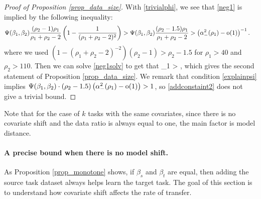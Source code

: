 \begin{proof}[Proof of Proposition \ref{prop_data_size}]
With \eqref{trivialphi}, we see that \eqref{neg1} is implied by the following inequality:
\begin{align}\label{neg1solv}
 & \Psi(\beta_1,\beta_2)  \frac{(\rho_2-1) \rho_1 }{\rho_1+\rho_2-2}\left( 1-\frac{1}{(\rho_1+\rho_2-2)^2}\right) >  \Psi(\beta_1,\beta_2) \frac{(\rho_2-1.5) \rho_1 }{\rho_1+\rho_2-2}> \left( \alpha_-^2(\rho_1) -  \operatorname{o}(1) \right)^{-1} .
 \end{align}
 where we used $(1-(\rho_1+\rho_2-2)^{-2})(\rho_2 - 1) > \rho_2-1.5$ for $\rho_1>40$ and $\rho_2>110$. Then we can solve \eqref{neg1solv} to get that
 \be\label{addconstaint2}
 \rho_1 >   ,
 \ee
which gives the second statement of Proposition \ref{prop_data_size}.
We remark that condition \eqref{explainpsi} implies $\Psi(\beta_1, \beta_2) \cdot  (\rho_2 - 1.5)\left( \alpha_-^2(\rho_1) -  \operatorname{o}(1) \right)>1$, so \eqref{addconstaint2} does not give a trivial bound. 
 \end{proof}
 






\iffalse
Note that for the case of $k$ tasks with the same covariates, since there is no covariate shift and the data ratio is always equal to one, the main factor is model distance.

\paragraph{A precise bound when there is no model shift.}
As Proposition \ref{prop_monotone} shows, if $\beta_s$ and $\beta_t$ are equal, then adding the source task dataset always helps learn the target task.
The goal of this section is to understand how covariate shift affects the rate of transfer. 


